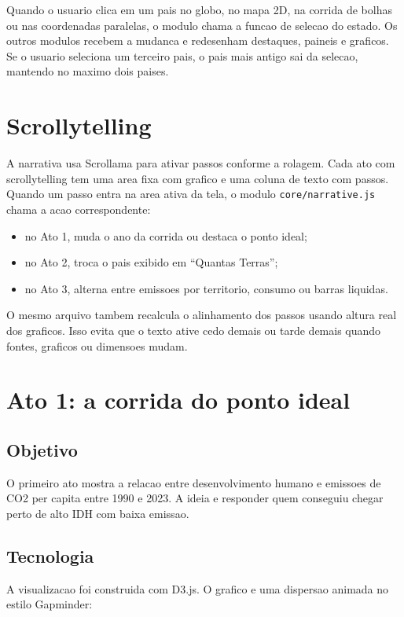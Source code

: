 \documentclass[12pt,a4paper]{article}
\begin{document}
Quando o usuario clica em um pais no globo, no mapa 2D, na corrida de bolhas ou nas coordenadas paralelas, o modulo chama a funcao de selecao do estado. Os outros modulos recebem a mudanca e redesenham destaques, paineis e graficos. Se o usuario seleciona um terceiro pais, o pais mais antigo sai da selecao, mantendo no maximo dois paises.

\section{Scrollytelling}

A narrativa usa Scrollama para ativar passos conforme a rolagem. Cada ato com scrollytelling tem uma area fixa com grafico e uma coluna de texto com passos. Quando um passo entra na area ativa da tela, o modulo \texttt{core/narrative.js} chama a acao correspondente:

\begin{itemize}
  \item no Ato 1, muda o ano da corrida ou destaca o ponto ideal;
  \item no Ato 2, troca o pais exibido em ``Quantas Terras'';
  \item no Ato 3, alterna entre emissoes por territorio, consumo ou barras liquidas.
\end{itemize}

O mesmo arquivo tambem recalcula o alinhamento dos passos usando altura real dos graficos. Isso evita que o texto ative cedo demais ou tarde demais quando fontes, graficos ou dimensoes mudam.

\section{Ato 1: a corrida do ponto ideal}

\subsection{Objetivo}

O primeiro ato mostra a relacao entre desenvolvimento humano e emissoes de CO2 per capita entre 1990 e 2023. A ideia e responder quem conseguiu chegar perto de alto IDH com baixa emissao.

\subsection{Tecnologia}

A visualizacao foi construida com D3.js. O grafico e uma dispersao animada no estilo Gapminder:
\end{document}
